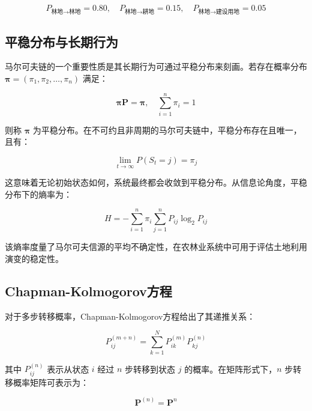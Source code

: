 \documentclass[a4paper,12pt]{ctexart}
\begin{document}
\begin{equation}
    P_{\text{林地} \to \text{林地}} = 0.80, \quad P_{\text{林地} \to \text{耕地}} = 0.15, \quad P_{\text{林地} \to \text{建设用地}} = 0.05
\end{equation}

\subsection{平稳分布与长期行为}

马尔可夫链的一个重要性质是其长期行为可通过平稳分布来刻画。若存在概率分布 $\boldsymbol{\pi} = (\pi_1, \pi_2, \ldots, \pi_n)$ 满足：

\begin{equation}
    \boldsymbol{\pi} \mathbf{P} = \boldsymbol{\pi}, \quad \sum_{i=1}^{n} \pi_i = 1
\end{equation}

则称 $\boldsymbol{\pi}$ 为平稳分布。在不可约且非周期的马尔可夫链中，平稳分布存在且唯一，且有：

\begin{equation}
    \lim_{t \to \infty} P(S_t = j) = \pi_j
\end{equation}

这意味着无论初始状态如何，系统最终都会收敛到平稳分布。从信息论角度，平稳分布下的熵率为：

\begin{equation}
    H = -\sum_{i=1}^{n} \pi_i \sum_{j=1}^{n} P_{ij} \log_2 P_{ij}
\end{equation}

该熵率度量了马尔可夫信源的平均不确定性，在农林业系统中可用于评估土地利用演变的稳定性。

\subsection{Chapman-Kolmogorov方程}

对于多步转移概率，Chapman-Kolmogorov方程给出了其递推关系：

\begin{equation}
    P_{ij}^{(m+n)} = \sum_{k=1}^{N} P_{ik}^{(m)} P_{kj}^{(n)}
\end{equation}

其中 $P_{ij}^{(n)}$ 表示从状态 $i$ 经过 $n$ 步转移到状态 $j$ 的概率。在矩阵形式下，$n$ 步转移概率矩阵可表示为：

\begin{equation}
    \mathbf{P}^{(n)} = \mathbf{P}^n
\end{equation}
\end{document}
